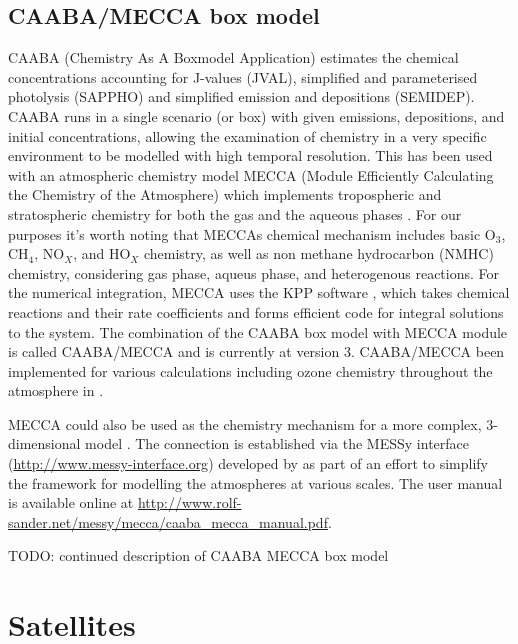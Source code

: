   \subsection{CAABA/MECCA box model}
    \label{ch_LitRev:sec:CAABAMECCAIntro}
    CAABA (Chemistry As A Boxmodel Application) estimates the chemical concentrations accounting for J-values (JVAL), simplified and parameterised photolysis (SAPPHO) and simplified emission and depositions (SEMIDEP).
    CAABA runs in a single scenario (or box) with given emissions, depositions, and initial concentrations, allowing the examination of chemistry in a very specific environment to be modelled with high temporal resolution.
    This has been used with an atmospheric chemistry model MECCA (Module Efficiently Calculating the Chemistry of the Atmosphere) which implements tropospheric and stratospheric chemistry for both the gas and the aqueous phases \citep{Sander2005}.
    For our purposes it's worth noting that MECCAs chemical mechanism includes basic O$_3$, CH$_4$, NO$_X$, and HO$_X$ chemistry, as well as non methane hydrocarbon (NMHC) chemistry, considering gas phase, aqueus phase, and heterogenous reactions. \citep{Sander2005}
    For the numerical integration, MECCA uses the KPP software \citep{SanduSander2006}, which takes chemical reactions and their rate coefficients and forms efficient code for integral solutions to the system.
    The combination of the CAABA box model with MECCA module is called CAABA/MECCA and is currently at version 3.
    CAABA/MECCA been implemented for various calculations including ozone chemistry throughout the atmosphere in \cite{Zanis2014}.

    MECCA could also be used as the chemistry mechanism for a more complex, 3-dimensional model \citep[e.g.][]{Jockel2006}.
    The connection is established via the MESSy interface (\url{http://www.messy-interface.org}) developed by \cite{Jockel2005} as part of an effort to simplify the framework for modelling the atmospheres at various scales.
    The user manual is available online at \url{http://www.rolf-sander.net/messy/mecca/caaba_mecca_manual.pdf}.

    TODO: continued description of CAABA MECCA box model
\section{Satellites}
\label{ch_LitRev:sec:satellites}


